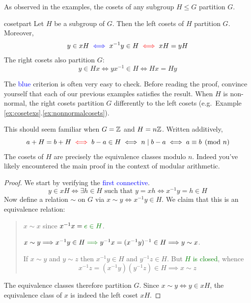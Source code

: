 \goodbreak


As observed in the examples, the cosets of any subgroup $H\le G$ partition $G$.

\begin{thm}{}{cosetpart}
	Let $H$ be a subgroup of $G$. Then the left cosets of $H$ partition $G$. Moreover,
	\[
		y\in xH
		\mathrel{\textcolor{blue}{\iff}} x^{-1}y\in H
		\mathrel{\textcolor{red}{\iff}} xH=yH
	\]
	The right cosets also partition $G$:
	\[
		y\in Hx\iff yx^{-1}\in H\iff Hx=Hy
	\]
\end{thm}

The \textcolor{blue}{blue} criterion is often very easy to check. Before reading the proof, convince yourself that each of our previous examples satisfies the result. When $H$ is non-normal, the right cosets partition $G$ differently to the left cosets (e.g.\ Example \ref*{ex:cosetexs}.\ref{ex:nonnormalcosets}).

\begin{example}{}{}
	This should seem familiar when $G=\mathbb{Z}$ and $H=n\mathbb{Z}$. Written additively,
	\[
		a+H=b+H\mathrel{\textcolor{red}{\iff}} b-a\in H\iff n\mid b-a \iff a\equiv b\pmod n
	\]
	The cosets of $H$ are precisely the equivalence classes modulo $n$. Indeed you've likely encountered the main proof in the context of modular arithmetic.
\end{example}

\begin{proof}
	We start by verifying the \textcolor{blue}{first connective}.
	\[
		y\in xH
		\iff \exists h\in H\text{ such that }y=xh
		\iff x^{-1}y=h\in H
	\]
	Now define a relation $\sim$ on $G$ via $x\sim y\Longleftrightarrow x^{-1}y\in H$. We claim that this is an equivalence relation:
	\begin{quote}
		\begin{description}\itemsep2pt
			\item[\normalfont\emph{Reflexivity}:] $x\sim x$ since $x^{-1}x=\textcolor{Green}{e\in H}$.
			\item[\normalfont\emph{Symmetry}:] $x\sim y\Longrightarrow x^{-1}y\in H \mathrel{\textcolor{Green}{\Longrightarrow}} y^{-1}x=(x^{-1}y)^{-1}\in H \Longrightarrow y\sim x$.
			\item[\normalfont\emph{Transitivity}:] If $x\sim y$ and $y\sim z$ then $x^{-1}y\in H$ and $y^{-1}z\in H$. But \textcolor{Green}{$H$ is closed}, whence
			\[
				x^{-1}z=(x^{-1}y)(y^{-1}z)\in H\implies x\sim z
			\]
		\end{description}
	\end{quote}
	The equivalence classes therefore partition $G$. Since $x\sim y\iff y\in xH$, the equivalence class of $x$ is indeed the left coset $xH$.\qedhere
\end{proof}



